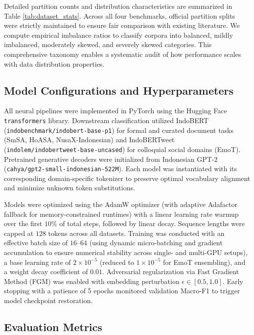 \documentclass{ieeeaccess}
\begin{document}
Detailed partition counts and distribution characteristics are summarized in Table \ref{tab:dataset_stats}. Across all four benchmarks, official partition splits were strictly maintained to ensure fair comparison with existing literature. We compute empirical imbalance ratios to classify corpora into balanced, mildly imbalanced, moderately skewed, and severely skewed categories. This comprehensive taxonomy enables a systematic audit of how performance scales with data distribution properties.

\subsection{Model Configurations and Hyperparameters}
\label{subsec:models}

All neural pipelines were implemented in PyTorch using the Hugging Face \texttt{transformers} library. Downstream classification utilized IndoBERT (\texttt{indobenchmark/}\allowbreak\texttt{indobert-}\allowbreak\texttt{base-p1}) for formal and curated document tasks (SmSA, HoASA, NusaX-Indonesian) and IndoBERTweet (\texttt{indolem/}\allowbreak\texttt{indobertweet-}\allowbreak\texttt{base-uncased}) for colloquial social domains (EmoT). Pretrained generative decoders were initialized from Indonesian GPT-2 (\texttt{cahya/}\allowbreak\texttt{gpt2-small-}\allowbreak\texttt{indonesian-522M}). Each model was instantiated with its corresponding domain-specific tokenizer to preserve optimal vocabulary alignment and minimize unknown token substitutions.

Models were optimized using the AdamW optimizer (with adaptive Adafactor fallback for memory-constrained runtimes) with a linear learning rate warmup over the first $10\%$ of total steps, followed by linear decay. Sequence lengths were capped at $128$ tokens across all datasets. Training was conducted with an effective batch size of $16\text{--}64$ (using dynamic micro-batching and gradient accumulation to ensure numerical stability across single- and multi-GPU setups), a base learning rate of $2 \times 10^{-5}$ (reduced to $1 \times 10^{-5}$ for EmoT ensembling), and a weight decay coefficient of $0.01$. Adversarial regularization via Fast Gradient Method (FGM) \cite{miyato2017adversarial} was enabled with embedding perturbation $\epsilon \in [0.5, 1.0]$. Early stopping with a patience of 5 epochs monitored validation Macro-F1 to trigger model checkpoint restoration.

\subsection{Evaluation Metrics}
\label{subsec:metrics}
\end{document}
